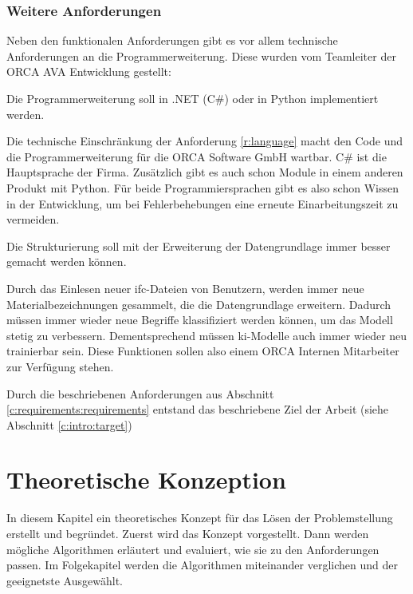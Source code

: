 \subsection{Weitere Anforderungen}
\label{c:requirements:requirements:additional}

Neben den funktionalen Anforderungen gibt es vor allem technische Anforderungen an die Programmerweiterung. Diese wurden vom Teamleiter der ORCA AVA Entwicklung gestellt:

\begin{requirement}
	\label{r:language}
	Die Programmerweiterung soll in .NET (C\#) oder in Python implementiert werden.
\end{requirement}

Die technische Einschränkung der Anforderung \ref{r:language} macht den Code und die Programmerweiterung für die ORCA Software GmbH wartbar. C\# ist die Hauptsprache der Firma. Zusätzlich gibt es auch schon Module in einem anderen Produkt mit Python. Für beide Programmiersprachen gibt es also schon Wissen in der Entwicklung, um bei Fehlerbehebungen eine erneute Einarbeitungszeit zu vermeiden.

\begin{requirement}
	\label{r:improvement}
	Die Strukturierung soll mit der Erweiterung der Datengrundlage immer besser gemacht werden können.
\end{requirement}

Durch das Einlesen neuer \ac{ifc}-Dateien von Benutzern, werden immer neue Materialbezeichnungen gesammelt, die die Datengrundlage erweitern. Dadurch müssen immer wieder neue Begriffe klassifiziert werden können, um das Modell stetig zu verbessern. Dementsprechend müssen \ac{ki}-Modelle auch immer wieder neu trainierbar sein. Diese Funktionen sollen also einem ORCA Internen Mitarbeiter zur Verfügung stehen.

Durch die beschriebenen Anforderungen aus Abschnitt \ref{c:requirements:requirements} entstand das beschriebene Ziel der Arbeit (siehe Abschnitt \ref{c:intro:target})

\chapter{Theoretische Konzeption}
\label{c:conception}
In diesem Kapitel ein theoretisches Konzept für das Lösen der Problemstellung erstellt und begründet. Zuerst wird das Konzept vorgestellt. Dann werden mögliche Algorithmen erläutert und evaluiert, wie sie zu den Anforderungen passen. Im Folgekapitel werden die Algorithmen miteinander verglichen und der geeignetste Ausgewählt.

